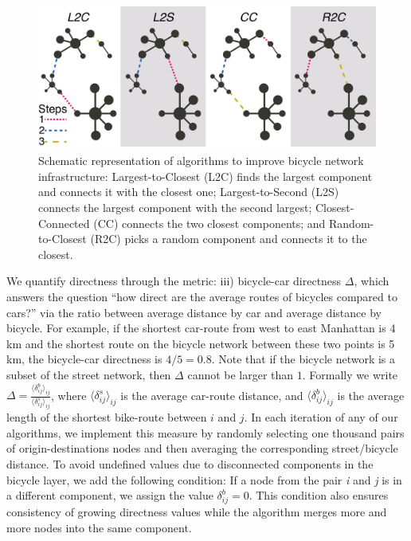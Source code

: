 \begin{figure}[t!]
  \centering
  \includegraphics[width=\textwidth]{images/datadriven/algorithms.png}
  \caption[Algorithms schematic representation]{Schematic representation of algorithms to improve bicycle network infrastructure: Largest-to-Closest (L2C) finds the largest component and connects it with the closest one; Largest-to-Second (L2S) connects the largest component with the second largest; Closest-Connected (CC) connects the two closest components; and Random-to-Closest (R2C) picks a random component and connects it to the closest.}
  \label{fig:algorithms}
\end{figure}

We quantify directness through the metric: iii) bicycle-car directness $\Delta$, which answers the question ``how direct are the average routes of bicycles compared to cars?'' via the ratio between average distance by car and average distance by bicycle. For example, if the shortest car-route from west to east Manhattan is 4\,km and the shortest route on the bicycle network between these two points is 5\,km, the bicycle-car directness is $4/5 = 0.8$. Note that if the bicycle network is a subset of the street network, then $\Delta$ cannot be larger than $1$. Formally we write $\Delta=\frac{\langle\delta_{ij}^b\rangle_{ij}}{\langle\delta_{ij}^s\rangle_{ij}}$, where $\langle\delta_{ij}^{s}\rangle_{ij}$ is the average car-route distance, and $\langle\delta_{ij}^{b}\rangle_{ij}$ is the average length of the shortest bike-route between $i$ and $j$. In each iteration of any of our algorithms, we implement this measure by randomly selecting one thousand pairs of origin-destinations nodes and then averaging the corresponding street/bicycle distance. To avoid undefined values due to disconnected components in the bicycle layer, we add the following condition: If a node from the pair \textit{i} and \textit{j} is in a different component, we assign the value $\delta_{ij}^{b} = 0$. This condition also ensures consistency of growing directness values while the algorithm merges more and more nodes into the same component.

